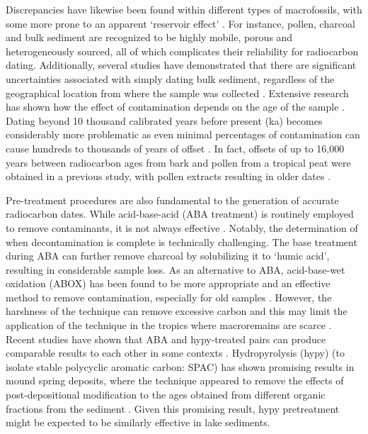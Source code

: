 \documentclass[
  12pt,
]{book}
\begin{document}
Discrepancies have likewise been found within different types of macrofossils, with some more prone to an apparent `reservoir effect' \citep{turneyImplicationsDatingWisconsinan2000}. For instance, pollen, charcoal and bulk sediment are recognized to be highly mobile, porous and heterogeneously sourced, all of which complicates their reliability for radiocarbon dating. Additionally, several studies have demonstrated that there are significant uncertainties associated with simply dating bulk sediment, regardless of the geographical location from where the sample was collected \citep{bjorckHighresolution14CDated1998, wustComparisonRadiocarbonAges2008, xuVariationsRadiocarbonAges2003}. Extensive research has shown how the effect of contamination depends on the age of the sample \citep{pettittPalaeolithicRadiocarbonChronology2003, highamRadiocarbonDatesOxford2011, woodRevolutionConventionPresent2015}. Dating beyond 10 thousand calibrated years before present (ka) becomes considerably more problematic as even minimal percentages of contamination can cause hundreds to thousands of years of offset \citep{aitkenSciencebasedDatingArchaeology1990, woodRevolutionConventionPresent2015}. In fact, offsets of up to 16,000 years between radiocarbon ages from bark and pollen from a tropical peat were obtained in a previous study, with pollen extracts resulting in older dates \citep{wustComparisonRadiocarbonAges2008}.

Pre-treatment procedures are also fundamental to the generation of accurate radiocarbon dates. While acid-base-acid (ABA treatment) is routinely employed to remove contaminants, it is not always effective \citep{chappellRadiocarbonLimitAustralian1996, gillespieAMSDatingLate1992}. Notably, the determination of when decontamination is complete is technically challenging. The base treatment during ABA can further remove charcoal by solubilizing it to `humic acid', resulting in considerable sample loss. As an alternative to ABA, acid-base-wet oxidation (ABOX) has been found to be more appropriate and an effective method to remove contamination, especially for old samples \citep{birdRadiocarbonDatingOld1999, birdEfficiencyCharcoalDecontamination2014}. However, the harshness of the technique can remove excessive carbon and this may limit the application of the technique in the tropics where macroremains are scarce \citep{birdRadiocarbonDatingOld1999}. Recent studies have shown that ABA and hypy-treated pairs can produce comparable results to each other in some contexts \citep{birdEfficiencyCharcoalDecontamination2014, alexRadiocarbonChronologyManot2017, david45610522019}. Hydropyrolysis (hypy) (to isolate stable polycyclic aromatic carbon: SPAC) has shown promising results in mound spring deposits, where the technique appeared to remove the effects of post-depositional modification to the ages obtained from different organic fractions from the sediment \citep{fieldUntanglingGeochronologicalComplexity2018}. Given this promising result, hypy pretreatment might be expected to be similarly effective in lake sediments.
\end{document}
